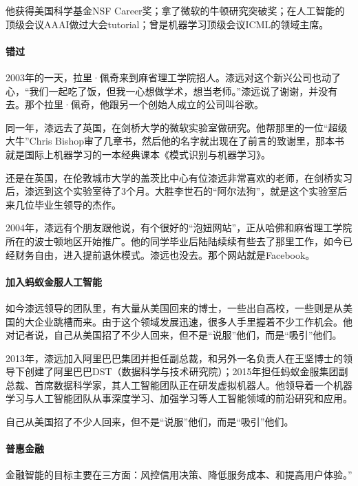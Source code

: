 \documentclass[letterpaper,11pt,english]{sphinxmanual}
\begin{document}
他获得美国科学基金NSF
Career奖；拿了微软的牛顿研究突破奖；在人工智能的顶级会议AAAI做过大会tutorial；曾是机器学习顶级会议ICML的领域主席。


\paragraph{错过}
\label{\detokenize{chapter_dive/qi_yuan:id1}}
2003年的一天，拉里·佩奇来到麻省理工学院招人。漆远对这个新兴公司也动了心，“我们一起吃了饭，但我一心想做学术，想当老师。”漆远说了谢谢，并没有去。那个拉里·佩奇，他跟另一个创始人成立的公司叫谷歌。

同一年，漆远去了英国，在剑桥大学的微软实验室做研究。他帮那里的一位“超级大牛”Chris
Bishop审了几章书，然后他的名字就出现在了前言的致谢里，那本书就是国际上机器学习的一本经典课本《模式识别与机器学习》。

还是在英国，在伦敦城市大学的盖茨比中心有位漆远非常喜欢的老师，在剑桥实习后，漆远到这个实验室待了3个月。大胜李世石的“阿尔法狗”，就是这个实验室后来几位毕业生领导的杰作。

2004年，漆远有个朋友跟他说，有个很好的“泡妞网站”，正从哈佛和麻省理工学院所在的波士顿地区开始推广。他的同学毕业后陆陆续续有些去了那里工作，如今已经财务自由，进入提前退休模式。漆远也没去。那个网站就是Facebook。


\paragraph{加入蚂蚁金服人工智能}
\label{\detokenize{chapter_dive/qi_yuan:id2}}
如今漆远领导的团队里，有大量从美国回来的博士，一些出自高校，一些则是从美国的大企业跳槽而来。由于这个领域发展迅速，很多人手里握着不少工作机会。他对记者说，自己从美国招了不少人回来，但不是“说服”他们，而是“吸引”他们。

2013年，漆远加入阿里巴巴集团并担任副总裁，和另外一名负责人在王坚博士的领导下创建了阿里巴巴DST（数据科学与技术研究院）；2015年担任蚂蚁金服集团副总裁、首席数据科学家，其人工智能团队正在研发虚拟机器人。他领导着一个机器学习与人工智能团队从事深度学习、加强学习等人工智能领域的前沿研究和应用。

自己从美国招了不少人回来，但不是“说服”他们，而是“吸引”他们。


\paragraph{普惠金融}
\label{\detokenize{chapter_dive/qi_yuan:id3}}
金融智能的目标主要在三方面：风控信用决策、降低服务成本、和提高用户体验。”
\end{document}
